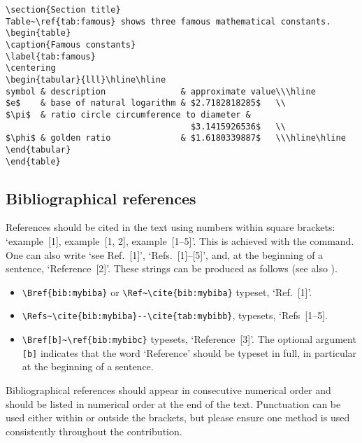 \documentclass{cernyrep}
\begin{document}
\begin{verbatim}
\section{Section title}
Table~\ref{tab:famous} shows three famous mathematical constants.
\begin{table}
\caption{Famous constants}
\label{tab:famous}
\centering
\begin{tabular}{lll}\hline\hline
symbol & description               & approximate value\\\hline
$e$    & base of natural logarithm & $2.7182818285$   \\
$\pi$  & ratio circle circumference to diameter &
                                     $3.1415926536$   \\
$\phi$ & golden ratio              & $1.6180339887$   \\\hline\hline
\end{tabular}
\end{table}
\end{verbatim}

\subsection{Bibliographical references}
\label{sec:biblioref}

References should be cited in the text using numbers within square
brackets: `example~[1], example~[1, 2], example~[1--5]'. This is
achieved with the  command. One can also write `see
Ref.~[1]', `Refs.~[1]--[5]', and, at the beginning of a sentence,
`Reference~[2]'. These strings can be produced as follows (see also
).
\begin{itemize}
\item \verb!\Bref{bib:mybiba}! or \verb!\Ref~\cite{bib:mybiba}! 
      typeset, \eg `Ref.~[1]'.
\item \verb!\Refs~\cite{bib:mybiba}--\cite{tab:mybibb}!, 
      typesets, \eg `Refs~[1--5].
\item \verb!\Bref[b]~\ref{bib:mybibc}! typesets, \eg `Reference~[3]'.
       The optional argument \texttt{[b]} indicates that the word
       `Reference' should be typeset in full, in particular at the
       beginning of a sentence.
\end{itemize}

Bibliographical references should appear in consecutive numerical
order and should be listed in numerical order at the end of the
text. Punctuation can be used either within or outside the brackets,
but please ensure one method is used consistently throughout the
contribution.
\end{document}
